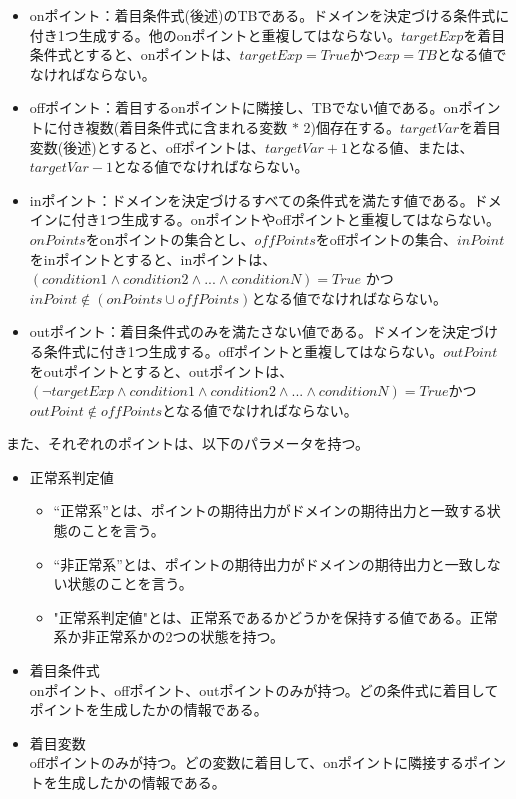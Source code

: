\documentclass[uplatex, report, a4j, 10pt]{jsbook}
\begin{document}
\begin{itemize}
  \item onポイント：着目条件式(後述)のTBである。ドメインを決定づける条件式に付き1つ生成する。他のonポイントと重複してはならない。$targetExp$を着目条件式とすると、onポイントは、$targetExp = True$かつ$exp = TB$となる値でなければならない。
  \item offポイント：着目するonポイントに隣接し、TBでない値である。onポイントに付き複数(着目条件式に含まれる変数 $*$ 2)個存在する。$targetVar$を着目変数(後述)とすると、offポイントは、$targetVar + 1$となる値、または、$targetVar - 1$となる値でなければならない。
  \item inポイント：ドメインを決定づけるすべての条件式を満たす値である。ドメインに付き1つ生成する。onポイントやoffポイントと重複してはならない。$onPoints$をonポイントの集合とし、$offPoints$をoffポイントの集合、$inPoint$をinポイントとすると、inポイントは、 $(condition1 \land condition2 \land ... \land conditionN) = True$ かつ $inPoint \notin (onPoints \cup offPoints)$となる値でなければならない。
  \item outポイント：着目条件式のみを満たさない値である。ドメインを決定づける条件式に付き1つ生成する。offポイントと重複してはならない。$outPoint$をoutポイントとすると、outポイントは、$ (\lnot targetExp \land condition1 \land condition2 \land ... \land conditionN) = True$かつ$outPoint \notin offPoints$となる値でなければならない。
\end{itemize}
また、それぞれのポイントは、以下のパラメータを持つ。
\begin{itemize}
  \item 正常系判定値
        \begin{itemize}
          \item “正常系”とは、ポイントの期待出力がドメインの期待出力と一致する状態のことを言う。
          \item “非正常系”とは、ポイントの期待出力がドメインの期待出力と一致しない状態のことを言う。
          \item "正常系判定値"とは、正常系であるかどうかを保持する値である。正常系か非正常系かの2つの状態を持つ。
        \end{itemize}
  \item 着目条件式\\
        onポイント、offポイント、outポイントのみが持つ。どの条件式に着目してポイントを生成したかの情報である。
  \item 着目変数\\
        offポイントのみが持つ。どの変数に着目して、onポイントに隣接するポイントを生成したかの情報である。
\end{itemize}
\end{document}
